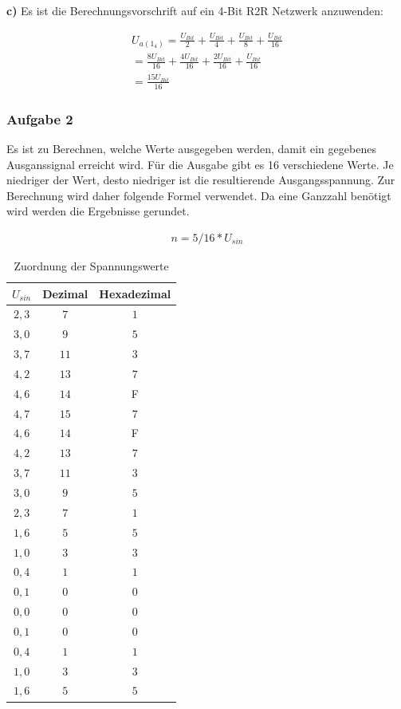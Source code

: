 \textbf{c)} Es ist die Berechnungsvorschrift auf ein 4-Bit R2R Netzwerk anzuwenden:

\begin{align}
    U_{a(1_4)} = \frac{U_{Bit}}{2} + \frac{U_{Bit}}{4} + \frac{U_{Bit}}{8} + \frac{U_{Bit}}{16} \\
    =  \frac{8U_{Bit}}{16} + \frac{4U_{Bit}}{16} + \frac{2U_{Bit}}{16} + \frac{U_{Bit}}{16} \\
    =  \frac{15U_{Bit}}{16}
\end{align}

\subsubsection{Aufgabe 2}

Es ist zu Berechnen, welche Werte ausgegeben werden, damit ein gegebenes Ausganssignal erreicht wird.
Für die Ausgabe gibt es 16 verschiedene Werte.
Je niedriger der Wert, desto niedriger ist die resultierende Ausgangsspannung.
Zur Berechnung wird daher folgende Formel verwendet.
Da eine Ganzzahl benötigt wird werden die Ergebnisse gerundet.

\begin{align}
    n = 5 / 16 * U_{sin}
\end{align}


\begin{table}[h]
    \centering
    \caption{Zuordnung der Spannungswerte}
    \label{tab:zuordnung-der-spannungswerte}
    \begin{tabular}{| c | c | c |}
        \hline
        $U_{sin}$ & Dezimal & Hexadezimal \\
        \hline
        $2,3$ & $7$ & $1$ \\
        $3,0$ & $9$ & $5$ \\
        $3,7$ & $11$ & $3$ \\
        $4,2$ & $13$ & $7$ \\
        $4,6$ & $14$ & F \\
        $4,7$ & $15$ & $7$ \\
        $4,6$ & $14$ & F \\
        $4,2$ & $13$ & $7$ \\
        $3,7$ & $11$ & $3$ \\
        $3,0$ & $9$ & $5$ \\
        $2,3$ & $7$ & $1$ \\
        $1,6$ & $5$ & $5$ \\
        $1,0$ & $3$ & $3$ \\
        $0,4$ & $1$ & $1$ \\
        $0,1$ & $0$ & $0$ \\
        $0,0$ & $0$ & $0$ \\
        $0,1$ & $0$ & $0$ \\
        $0,4$ & $1$ & $1$ \\
        $1,0$ & $3$ & $3$ \\
        $1,6$ & $5$ & $5$ \\
        \hline
    \end{tabular}
\end{table}

